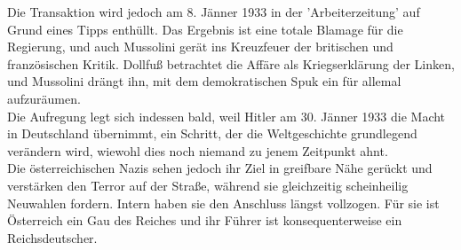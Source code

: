 \documentclass[letterpaper, 12pt]{article}
\begin{document}
Die Transaktion wird jedoch am 8. Jänner 1933 in der 'Arbeiterzeitung' auf Grund eines Tipps enthüllt. Das Ergebnis ist eine totale Blamage für die Regierung, und auch Mussolini gerät ins Kreuzfeuer der britischen und französischen Kritik. Dollfuß betrachtet die Affäre als Kriegserklärung der Linken, und Mussolini drängt ihn, mit dem demokratischen Spuk ein für allemal aufzuräumen. \\
Die Aufregung legt sich indessen bald, weil Hitler am 30. Jänner 1933 die Macht in Deutschland übernimmt, ein Schritt, der die Weltgeschichte grundlegend verändern wird, wiewohl dies noch niemand zu jenem Zeitpunkt ahnt. \\
Die österreichischen Nazis sehen jedoch ihr Ziel in greifbare Nähe gerückt und verstärken den Terror auf der Straße, während sie gleichzeitig scheinheilig Neuwahlen fordern. Intern haben sie den Anschluss längst vollzogen. Für sie ist Österreich ein Gau des Reiches und ihr Führer ist konsequenterweise ein Reichsdeutscher.
\end{document}
